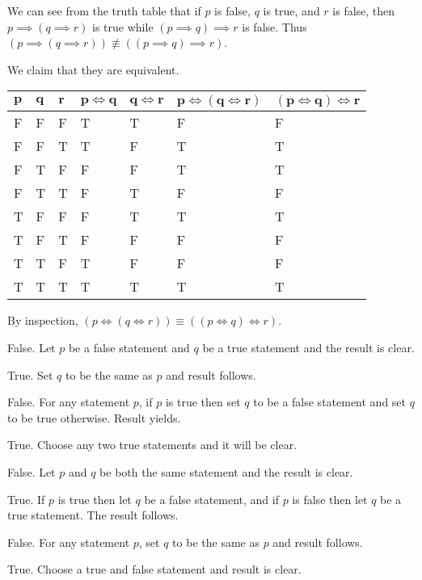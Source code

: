 \begin{questions}
\begin{partquestions}{\alph*}
        We can see from the truth table that if $p$ is false, $q$ is true, and $r$ is false, then $p \implies (q \implies r)$ is true while $(p \implies q) \implies r$ is false. Thus $(p \implies (q \implies r)) \not\equiv ((p \implies q) \implies r)$.

        \item We claim that they are equivalent.
        \begin{table}[H]
            \centering
            \begin{tabular}{|l|l|l||l|l||l|l|}
                \hline
                $\boldsymbol{p}$ & $\boldsymbol{q}$ & $\boldsymbol{r}$ & $\boldsymbol{p \iff q}$ & $\boldsymbol{q \iff r}$ & $\boldsymbol{p \iff (q \iff r)}$ & $\boldsymbol{(p \iff q) \iff r}$ \\ \hline
                F & F & F & T & T & F & F \\ \hline
                F & F & T & T & F & T & T \\ \hline
                F & T & F & F & F & T & T \\ \hline
                F & T & T & F & T & F & F \\ \hline
                T & F & F & F & T & T & T \\ \hline
                T & F & T & F & F & F & F \\ \hline
                T & T & F & T & F & F & F \\ \hline
                T & T & T & T & T & T & T \\ \hline
            \end{tabular}
        \end{table}

        By inspection, $(p \iff (q \iff r)) \equiv ((p \iff q) \iff r)$.
    \end{partquestions}

    \item \begin{partquestions}{\alph*}
        \item False. Let $p$ be a false statement and $q$ be a true statement and the result is clear.
        \item True. Set $q$ to be the same as $p$ and result follows.
        \item False. For any statement $p$, if $p$ is true then set $q$ to be a false statement and set $q$ to be true otherwise. Result yields.
        \item True. Choose any two true statements and it will be clear.
        \item False. Let $p$ and $q$ be both the same statement and the result is clear.
        \item True. If $p$ is true then let $q$ be a false statement, and if $p$ is false then let $q$ be a true statement. The result follows.
        \item False. For any statement $p$, set $q$ to be the same as $p$ and result follows.
        \item True. Choose a true and false statement and result is clear.
    \end{partquestions}


\end{questions}
